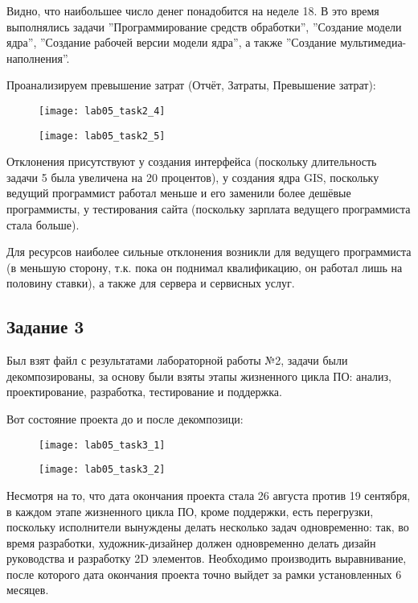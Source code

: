 Видно, что наибольшее число денег понадобится на неделе 18. В это время выполнялись задачи ''Программирование средств обработки'', ''Создание модели ядра'', ''Создание рабочей версии модели ядра'', а также ''Создание мультимедиа-наполнения''.

Проанализируем превышение затрат (Отчёт, Затраты, Превышение затрат):

\begin{figure}[h!]
	\texttt{[image: lab05\_task2\_4]}
\end{figure}

\begin{figure}[h!]
	\texttt{[image: lab05\_task2\_5]}
\end{figure}

\clearpage

Отклонения присутствуют у создания интерфейса (поскольку длительность задачи 5 была увеличена на 20 процентов), у создания ядра GIS, поскольку ведущий программист работал меньше и его заменили более дешёвые программисты, у тестирования сайта (поскольку зарплата ведущего программиста стала больше).

Для ресурсов наиболее сильные отклонения возникли для ведущего программиста (в меньшую сторону, т.к. пока он поднимал квалификацию, он работал лишь на половину ставки), а также для сервера и сервисных услуг.


\subsection*{Задание 3}

Был взят файл с результатами лабораторной работы №2, задачи были декомпозированы, за основу были взяты этапы жизненного цикла ПО: анализ, проектирование, разработка, тестирование и поддержка.

Вот состояние проекта до и после декомпозици:

\begin{figure}[h!]
	\texttt{[image: lab05\_task3\_1]}
\end{figure}

\begin{figure}[h!]
	\texttt{[image: lab05\_task3\_2]}
\end{figure}


Несмотря на то, что дата окончания проекта стала 26 августа против 19 сентября, в каждом этапе жизненного цикла ПО, кроме поддержки, есть перегрузки, поскольку исполнители вынуждены делать несколько задач одновременно: так, во время разработки, художник-дизайнер должен одновременно делать дизайн руководства и разработку 2D элементов. Необходимо производить выравнивание, после которого дата окончания проекта точно выйдет за рамки установленных 6 месяцев.

